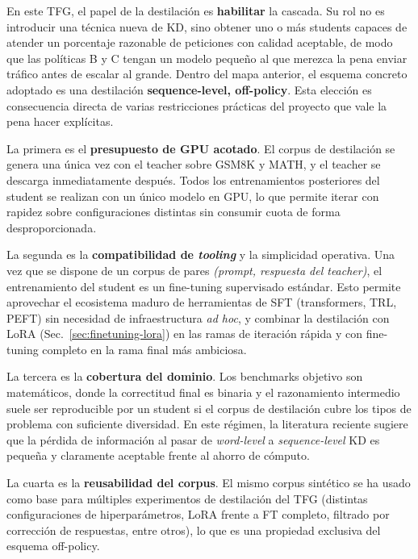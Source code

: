 En este TFG, el papel de la destilación es \textbf{habilitar} la cascada. Su rol no es introducir una técnica nueva de KD, sino obtener uno o más students capaces de atender un porcentaje razonable de peticiones con calidad aceptable, de modo que las políticas B y C tengan un modelo pequeño al que merezca la pena enviar tráfico antes de escalar al grande. Dentro del mapa anterior, el esquema concreto adoptado es una destilación \textbf{sequence-level, off-policy}. Esta elección es consecuencia directa de varias restricciones prácticas del proyecto que vale la pena hacer explícitas.

La primera es el \textbf{presupuesto de GPU acotado}. El corpus de destilación se genera una única vez con el teacher sobre GSM8K y MATH, y el teacher se descarga inmediatamente después. Todos los entrenamientos posteriores del student se realizan con un único modelo en GPU, lo que permite iterar con rapidez sobre configuraciones distintas sin consumir cuota de forma desproporcionada.

La segunda es la \textbf{compatibilidad de \textit{tooling}} y la simplicidad operativa. Una vez que se dispone de un corpus de pares \emph{(prompt, respuesta del teacher)}, el entrenamiento del student es un fine-tuning supervisado estándar. Esto permite aprovechar el ecosistema maduro de herramientas de SFT (transformers, TRL, PEFT) sin necesidad de infraestructura \textit{ad hoc}, y combinar la destilación con LoRA (Sec.~\ref{sec:finetuning-lora}) en las ramas de iteración rápida y con fine-tuning completo en la rama final más ambiciosa.

La tercera es la \textbf{cobertura del dominio}. Los benchmarks objetivo son matemáticos, donde la correctitud final es binaria y el razonamiento intermedio suele ser reproducible por un student si el corpus de destilación cubre los tipos de problema con suficiente diversidad. En este régimen, la literatura reciente sugiere que la pérdida de información al pasar de \emph{word-level} a \emph{sequence-level} KD es pequeña y claramente aceptable frente al ahorro de cómputo.

La cuarta es la \textbf{reusabilidad del corpus}. El mismo corpus sintético se ha usado como base para múltiples experimentos de destilación del TFG (distintas configuraciones de hiperparámetros, LoRA frente a FT completo, filtrado por corrección de respuestas, entre otros), lo que es una propiedad exclusiva del esquema off-policy.

